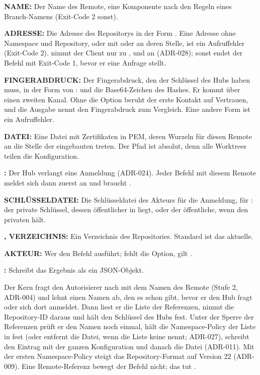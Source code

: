 \startitemize
\item {\bf NAME:} Der Name des Remote, eine Komponente nach den Regeln eines Branch-Namens
(Exit-Code 2 sonst).
\item {\bf ADRESSE:} Die Adresse des Repositorys in der Form\crlf
{}.
Eine Adresse ohne Namespace und Repository, oder mit  oder  an deren Stelle,
ist ein Aufruffehler (Exit-Code 2).
 nimmt der Client nur zu ,  und  an
(ADR-028); sonst endet der Befehl mit Exit-Code 1, bevor er eine Anfrage stellt.
\item {\bf {} FINGERABDRUCK:} Der Fingerabdruck, den der Schlüssel des Hubs haben
muss, in der Form von :  und die Base64-Zeichen des Hashes.
Er kommt über einen zweiten Kanal. Ohne die Option beruht der erste Kontakt auf Vertrauen, und
die Ausgabe nennt den Fingerabdruck zum Vergleich. Eine andere Form ist ein Aufruffehler.
\item {\bf {} DATEI:} Eine Datei mit Zertifikaten in PEM, deren Wurzeln für diesen
Remote an die Stelle der eingebauten treten. Der Pfad ist absolut, denn alle Worktrees teilen
die Konfiguration.
\item {\bf {}:} Der Hub verlangt eine Anmeldung (ADR-024). Jeder Befehl mit diesem
Remote meldet sich dann zuerst an und braucht .
\item {\bf {} SCHLÜSSELDATEI:} Die Schlüsseldatei des Akteurs für die Anmeldung, für
: der private Schlüssel, dessen öffentlicher in
 liegt, oder der öffentliche, wenn  den privaten hält.
\item {\bf {},  VERZEICHNIS:} Ein Verzeichnis des Repositories.
Standard ist das aktuelle.
\item {\bf {} AKTEUR:} Wer den Befehl ausführt; fehlt die Option, gilt
.
\item {\bf {}:} Schreibt das Ergebnis als ein JSON-Objekt.
\stopitemize

Der Kern fragt den Autorisierer nach  mit dem Namen des Remote (Stufe 2,
ADR-004) und lehnt einen Namen ab, den es schon gibt, bevor er den Hub fragt oder sich dort
anmeldet.
Dann liest er die Liste der Referenzen, nimmt die Repository-ID daraus und hält den Schlüssel
des Hubs fest. Unter der Sperre der Referenzen prüft er den Namen noch einmal, hält die
Namespace-Policy der Liste in  fest (oder entfernt die Datei, wenn die
Liste keine nennt; ADR-027), schreibt den Eintrag  mit der ganzen
Konfiguration und danach die Datei  (ADR-011).
Mit der ersten Namespace-Policy steigt das Repository-Format auf Version 22 (ADR-009).
Eine Remote-Referenz bewegt der Befehl nicht; das tut .

